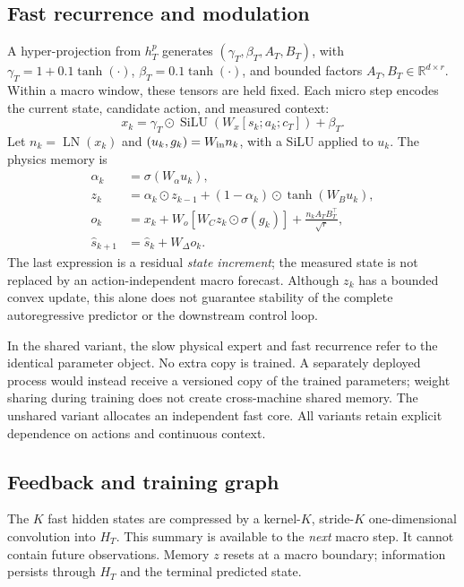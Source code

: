 \documentclass[10pt,twocolumn]{article}
\newcommand{\R}{\mathbb{R}}
\begin{document}
\subsection{Fast recurrence and modulation}
A hyper-projection from $h_T^p$ generates
$(\gamma_T,\beta_T,A_T,B_T)$, with
$\gamma_T=1+0.1\tanh(\cdot)$,
$\beta_T=0.1\tanh(\cdot)$, and bounded factors $A_T,B_T\in\R^{d\times r}$.
Within a macro window, these tensors are held fixed. Each micro step encodes
the current state, candidate action, and measured context:
\begin{equation}
 x_k=\gamma_T\odot\operatorname{SiLU}(W_x[s_k;a_k;c_T])+\beta_T.
\end{equation}
Let $n_k=\operatorname{LN}(x_k)$ and
$(u_k,g_k)=W_{\rm in}n_k$, with a SiLU applied to $u_k$. The physics memory is
\begin{align}
 \alpha_k&=\sigma(W_\alpha u_k),\\
 z_k&=\alpha_k\odot z_{k-1}+
        (1-\alpha_k)\odot\tanh(W_Bu_k),\\
 o_k&=x_k+W_o[W_Cz_k\odot\sigma(g_k)]
           +\frac{n_kA_TB_T^\top}{\sqrt r},\\
 \hat s_{k+1}&=\hat s_k+W_\Delta o_k.
 \label{eq:fast}
\end{align}
The last expression is a residual \emph{state increment}; the measured state is
not replaced by an action-independent macro forecast. Although $z_k$ has a
bounded convex update, this alone does not guarantee stability of the complete
autoregressive predictor or the downstream control loop.

In the shared variant, the slow physical expert and fast recurrence refer to
the identical parameter object. No extra copy is trained. A separately deployed
process would instead receive a versioned copy of the trained parameters;
weight sharing during training does not create cross-machine shared memory.
The unshared variant allocates an independent fast core. All variants retain
explicit dependence on actions and continuous context.

\subsection{Feedback and training graph}
The $K$ fast hidden states are compressed by a kernel-$K$, stride-$K$ one-dimensional
convolution into $H_T$. This summary is available to the \emph{next} macro step.
It cannot contain future observations. Memory $z$ resets at a macro boundary;
information persists through $H_T$ and the terminal predicted state.
\end{document}
